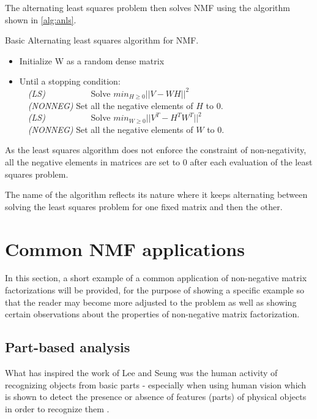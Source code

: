 \documentclass[thesis=M,english]{FITthesis}[2012/10/20]
\begin{document}
The alternating least squares problem then solves NMF using the algorithm
shown in \ref{alg:anls}.

\begin{algorithm}[h]
  \caption{Basic Alternating least squares algorithm for NMF. \cite{nmf-anls}}
  \label{alg:anls}
  \begin{itemize}
    \item Initialize W as a random dense matrix\\
    \item Until a stopping condition:\\
    ~~\emph{(LS)} ~~~~~~~~~~Solve $min_{H \geq 0}||V - WH||^{2}$\\
    ~~\emph{(NONNEG)} Set all the negative elements of $H$ to $0$.\\
    ~~\emph{(LS)} ~~~~~~~~~~Solve $min_{W \geq 0}||V^{T} - H^{T}W^{T}||^{2}$\\
    ~~\emph{(NONNEG)} Set all the negative elements of $W$ to $0$.\\
  \end{itemize}
\end{algorithm}

As the least squares algorithm does not enforce the constraint of non-negativity,
all the negative elements in matrices are set to $0$ after each evaluation of
the least squares problem.

The name of the algorithm reflects its nature where it keeps alternating between
solving the least squares problem for one fixed matrix and then the other.


\section{Common NMF applications}
In this section, a short example of a common application of non-negative matrix
factorizations will be provided, for the purpose of showing a specific example
so that the reader may become more adjusted to the problem as well as showing
certain observations about the properties of non-negative matrix factorization.


\subsection{Part-based analysis}
What has inspired the work of Lee and Seung \cite{lee99} was the human activity
of recognizing objects from basic parts - especially when using human vision which
is shown to detect the presence or absence of features (parts)
of physical objects in order to recognize them \cite{component-recognition}.
\end{document}
